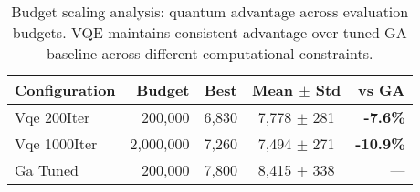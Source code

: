 \begin{table}[htb]
    \centering
    \caption{Budget scaling analysis: quantum advantage across evaluation budgets. VQE maintains consistent advantage over tuned GA baseline across different computational constraints.}
    \label{tab:budget_scaling}
    \begin{tabular}{lrccr}
        \toprule
        Configuration & Budget & Best & Mean $\pm$ Std & vs GA \\
        \midrule
        Vqe 200Iter & 200,000 & 6,830 & 7,778 $\pm$ 281 & \textbf{-7.6\%} \\
        Vqe 1000Iter & 2,000,000 & 7,260 & 7,494 $\pm$ 271 & \textbf{-10.9\%} \\
        Ga Tuned & 200,000 & 7,800 & 8,415 $\pm$ 338 & — \\
        \bottomrule
    \end{tabular}
\end{table}